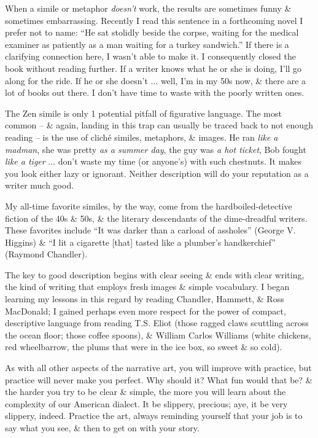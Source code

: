 \documentclass{article}
\numberwithin{equation}{section}
\begin{document}
When a simile or metaphor \textit{doesn't} work, the results are sometimes funny \& sometimes embarrassing. Recently I read this sentence in a forthcoming novel I prefer not to name: ``He sat stolidly beside the corpse, waiting for the medical examiner as patiently as a man waiting for a turkey sandwich.'' If there is a clarifying connection here, I wasn't able to make it. I consequently closed the book without reading further. If a writer knows what he or she is doing, I'll go along for the ride. If he or she doesn't $\ldots$ well, I'm in my 50s now, \& there are a lot of books out there. I don't have time to waste with the poorly written ones.

The Zen simile is only 1 potential pitfall of figurative language. The most common -- \& again, landing in this trap can usually be traced back to not enough reading -- is the use of clich\'e similes, metaphors, \& images. He ran \textit{like a madman}, she was pretty \textit{as a summer day}, the guy was \textit{a hot ticket}, Bob fought \textit{like a tiger} $\ldots$ don't waste my time (or anyone's) with such chestnuts. It makes you look either lazy or ignorant. Neither description will do your reputation as a writer much good.

My all-time favorite similes, by the way, come from the hardboiled-detective fiction of the 40s \& 50s, \& the literary descendants of the dime-dreadful writers. These favorites include ``It was darker than a carload of assholes'' (George V. Higgins) \& ``I lit a cigarette [that] tasted like a plumber's handkerchief'' (Raymond Chandler).

The key to good description begins with clear seeing \& ends with clear writing, the kind of writing that employs fresh images \& simple vocabulary. I began learning my lessons in this regard by reading Chandler, Hammett, \& Ross MacDonald; I gained perhaps even more respect for the power of compact, descriptive language from reading T.S. Eliot (those ragged claws scuttling across the ocean floor; those coffee spoons), \& William Carlos Williams (white chickens, red wheelbarrow, the plums that were in the ice box, so sweet \& so cold).

As with all other aspects of the narrative art, you will improve with practice, but practice will never make you perfect. Why should it? What fun would that be? \& the harder you try to be clear \& simple, the more you will learn about the complexity of our American dialect. It be slippery, precious; aye, it be very slippery, indeed. Practice the art, always reminding yourself that your job is to say what you see, \& then to get on with your story.
\end{document}
